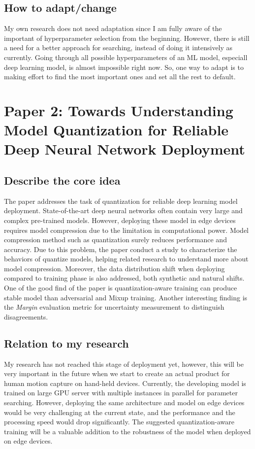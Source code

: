 \documentclass{article}
\begin{document}
\subsection{How to adapt/change}
My own research does not need adaptation since I am fully aware of the important of hyperparameter selection from the beginning. However, there is still a need for a better approach for searching, instead of doing it intensively as currently. Going through all possible hyperparameters of an ML model, especiall deep learning model, is almost impossible right now. So, one way to adapt is to making effort to find the most important ones and set all the rest to default.


\newpage
\section{Paper 2: Towards Understanding Model Quantization for Reliable Deep Neural Network Deployment}
\subsection{Describe the core idea}
The paper addresses the task of quantization for reliable deep learning model deployment. State-of-the-art deep neural networks often contain very large and complex pre-trained models. However, deploying these model in edge devices requires model compression due to the limitation in computational power. Model compression method such as quantization surely reduces performance and accuracy. Due to this problem, the paper conduct a study to characterize the behaviors of quantize models, helping related research to understand more about model compression. Moreover, the data distribution shift when deploying compared to training phase is also addressed, both synthetic and natural shifts. One of the good find of the paper is quantization-aware training can produce stable model than adversarial and Mixup training. Another interesting finding is the \textit{Margin} evaluation metric for uncertainty measurement to distinguish disagreements.

\subsection{Relation to my research}
My research has not reached this stage of deployment yet, however, this will be very important in the future when we start to create an actual product for human motion capture on hand-held devices. Currently, the developing model is trained on large GPU server with multiple instances in parallel for parameter searching. However, deploying the same architecture and model on edge devices would be very challenging at the current state, and the performance and the processing speed would drop significantly. The suggested quantization-aware training will be a valuable addition to the robustness of the model when deployed on edge devices.
\end{document}
